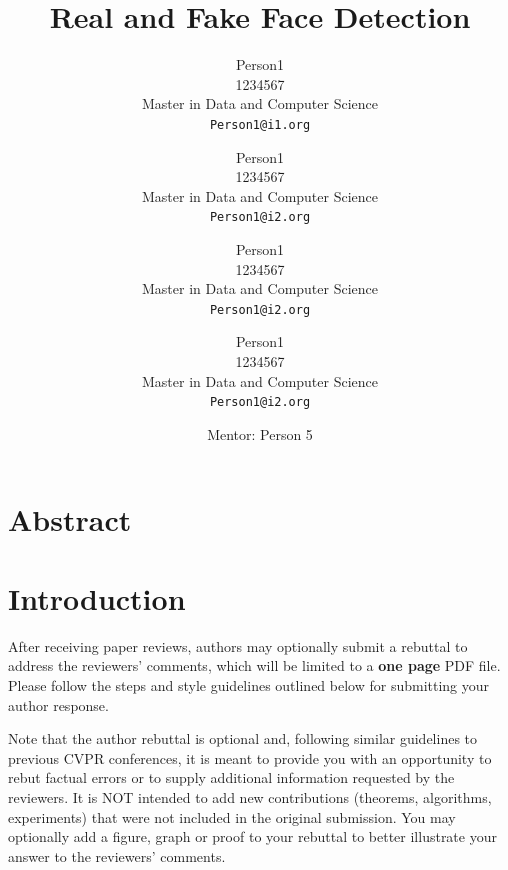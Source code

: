 \documentclass[final]{cvpr}
\begin{document}
\title{Real and Fake Face Detection}  %

\author{Person1\\
1234567\\
Master in Data and Computer Science\\
{\tt\small Person1@i1.org}
\and
Person1\\
1234567\\
Master in Data and Computer Science\\
{\tt\small Person1@i2.org}
\and
Person1\\
1234567\\
Master in Data and Computer Science\\
{\tt\small Person1@i2.org}
\and
Person1\\
1234567\\
Master in Data and Computer Science\\
{\tt\small Person1@i2.org}
\and
Mentor: Person 5
}


\maketitle
\thispagestyle{empty}


\section{Abstract}

\section{Introduction}

After receiving paper reviews, authors may optionally submit a rebuttal to address the reviewers' comments, which will be limited to a {\bf one page} PDF file.  Please follow the steps and style guidelines outlined below for submitting your author response.

Note that the author rebuttal is optional and, following similar guidelines to previous CVPR conferences, it is meant to provide you with an opportunity to rebut factual errors or to supply additional information requested by the reviewers. It is NOT intended to add new contributions (theorems, algorithms, experiments) that were not included in the original submission. You may optionally add a figure, graph or proof to your rebuttal to better illustrate your answer to the reviewers' comments.
\end{document}
